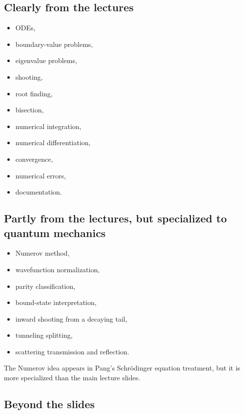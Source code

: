 \documentclass[11pt]{article}
\begin{document}
    \subsection{Clearly from the lectures}

    \begin{itemize}
        \item ODEs,
        \item boundary-value problems,
        \item eigenvalue problems,
        \item shooting,
        \item root finding,
        \item bisection,
        \item numerical integration,
        \item numerical differentiation,
        \item convergence,
        \item numerical errors,
        \item documentation.
    \end{itemize}

    \subsection{Partly from the lectures, but specialized to quantum mechanics}

    \begin{itemize}
        \item Numerov method,
        \item wavefunction normalization,
        \item parity classification,
        \item bound-state interpretation,
        \item inward shooting from a decaying tail,
        \item tunneling splitting,
        \item scattering transmission and reflection.
    \end{itemize}

    The Numerov idea appears in Pang's Schr\"odinger equation treatment, but it is more specialized than the main lecture slides.

    \subsection{Beyond the slides}
\end{document}
